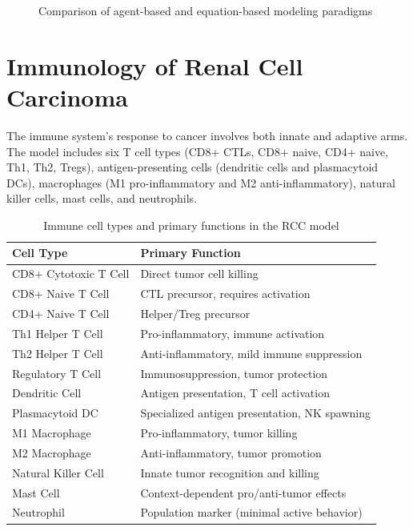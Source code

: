 \begin{figure}[htbp]
\centering
{}
\caption{Comparison of agent-based and equation-based modeling paradigms}
\label{fig:abm_vs_ode}
\end{figure}

\section{Immunology of Renal Cell Carcinoma}
\label{sec:bg_immunology}

The immune system's response to cancer involves both innate and adaptive arms. The model includes six T cell types (CD8+ CTLs, CD8+ naive, CD4+ naive, Th1, Th2, Tregs), antigen-presenting cells (dendritic cells and plasmacytoid DCs), macrophages (M1 pro-inflammatory and M2 anti-inflammatory), natural killer cells, mast cells, and neutrophils.

\begin{table}[htbp]
\centering
\caption{Immune cell types and primary functions in the RCC model}
\label{tab:immune_cells}
\begin{tabular}{ll}
\toprule
\textbf{Cell Type} & \textbf{Primary Function} \\
\midrule
CD8+ Cytotoxic T Cell & Direct tumor cell killing \\
CD8+ Naive T Cell & CTL precursor, requires activation \\
CD4+ Naive T Cell & Helper/Treg precursor \\
Th1 Helper T Cell & Pro-inflammatory, immune activation \\
Th2 Helper T Cell & Anti-inflammatory, mild immune suppression \\
Regulatory T Cell & Immunosuppression, tumor protection \\
Dendritic Cell & Antigen presentation, T cell activation \\
Plasmacytoid DC & Specialized antigen presentation, NK spawning \\
M1 Macrophage & Pro-inflammatory, tumor killing \\
M2 Macrophage & Anti-inflammatory, tumor promotion \\
Natural Killer Cell & Innate tumor recognition and killing \\
Mast Cell & Context-dependent pro/anti-tumor effects \\
Neutrophil & Population marker (minimal active behavior) \\
\bottomrule
\end{tabular}
\end{table}

